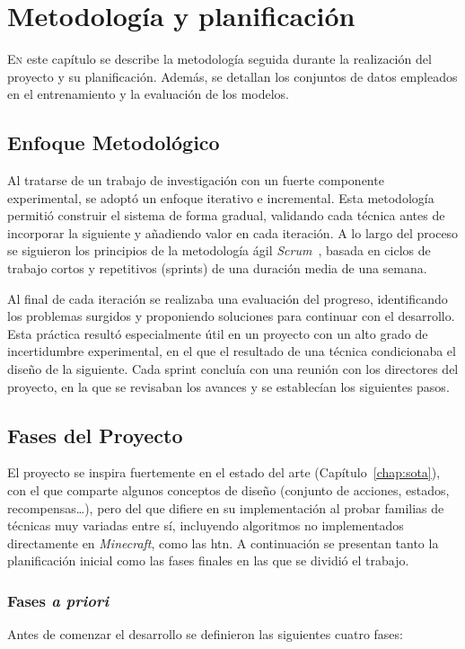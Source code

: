 \chapter{Metodología y planificación}
\label{chap:metodologia}

\lettrine{E}{n} este capítulo se describe la metodología seguida durante la
realización del proyecto y su planificación.
Además, se detallan los conjuntos de datos empleados en el
entrenamiento y la evaluación de los modelos.

\section{Enfoque Metodológico}
Al tratarse de un trabajo de investigación con un fuerte componente
experimental, se adoptó un enfoque iterativo e incremental. Esta metodología
permitió construir el sistema de forma gradual, validando cada técnica antes de
incorporar la siguiente y añadiendo valor en cada iteración. A lo largo del
proceso se siguieron los principios de la metodología ágil \textit{Scrum}~\cite{schwaber2020scrum},
basada en ciclos de trabajo cortos y repetitivos
({\glspl{sprint}}) de una duración media de una semana.

Al final de cada iteración se realizaba una evaluación del progreso,
identificando los problemas surgidos y proponiendo soluciones para
continuar con el desarrollo. Esta práctica resultó especialmente útil en un
proyecto con un alto grado de incertidumbre experimental, en el que el resultado de
una técnica condicionaba el diseño de la siguiente. Cada \gls{sprint}
concluía con una reunión con los directores del proyecto, en la
que se revisaban los avances y se establecían los siguientes pasos.

\section{Fases del Proyecto}
El proyecto se inspira fuertemente en el estado del arte (Capítulo~\ref{chap:sota}), con el
que comparte algunos conceptos de diseño (conjunto de acciones, estados, recompensas\dots), pero del que 
difiere en su implementación al probar familias de técnicas muy variadas entre sí, incluyendo algoritmos
no implementados directamente en \textit{Minecraft}, como las \gls{htn}. A continuación se presentan tanto la planificación
inicial como las fases finales en las que se dividió el trabajo.

\subsection{Fases \textit{a priori}}
Antes de comenzar el desarrollo se definieron las siguientes cuatro fases:

